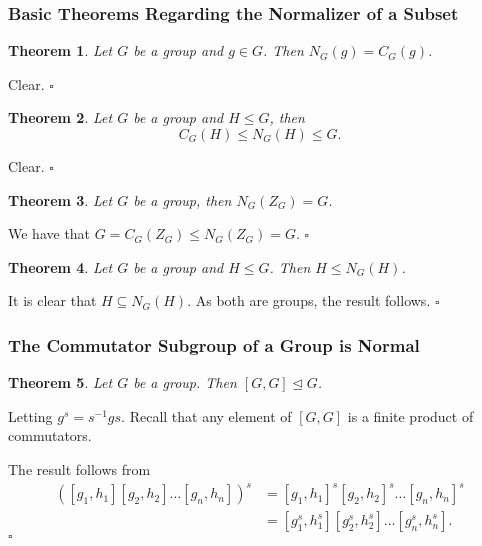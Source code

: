 \documentclass[10pt]{article}
\newtheorem{theorem}{Theorem}[section]
\newenvironment{proof}[1][Proof]{\begin{trivlist}
\item[\hskip \labelsep {\itshape #1}]}{\end{trivlist}}
\begin{document}
\subsubsection{Basic Theorems Regarding the Normalizer of a Subset}

\begin{theorem}
Let $G$ be a group and $g \in G$. Then $N_G(g) = C_G(g)$.
\end{theorem}

\begin{proof}
Clear. $\square$
\end{proof}

\begin{theorem}
Let $G$ be a group and $H \leq G$, then
$$C_G(H) \leq N_G(H) \leq G.$$
\end{theorem}

\begin{proof}
Clear. $\square$
\end{proof}

\begin{theorem}
Let $G$ be a group, then $N_G(Z_G) = G$.
\end{theorem}

\begin{proof}
We have that $G = C_G(Z_G) \leq N_G(Z_G) = G$. $\square$
\end{proof}

\begin{theorem}
Let $G$ be a group and $H \leq G$. Then $H \leq N_G(H)$.
\end{theorem}

\begin{proof}
It is clear that $H \subseteq N_G(H)$. As both are groups, the result follows. $\square$
\end{proof}

\subsubsection{The Commutator Subgroup of a Group is Normal}

\begin{theorem}
Let $G$ be a group. Then $[G, G] \mathrel{\unlhd} G$.
\end{theorem}

\begin{proof}
Letting $g^s = s^{-1}gs$. Recall that any element of $[G, G]$ is a finite product of commutators.

The result follows from
\begin{align*}
([g_1, h_1][g_2, h_2]\ldots [g_n, h_n])^s &= [g_1, h_1]^s[g_2, h_2]^s\ldots [g_n, h_n]^s\\
                                          &= [g_1^s, h_1^s][g_2^s, h_2^s]\ldots [g_n^s, h_n^s].
\end{align*} $\square$
\end{proof}
\end{document}
